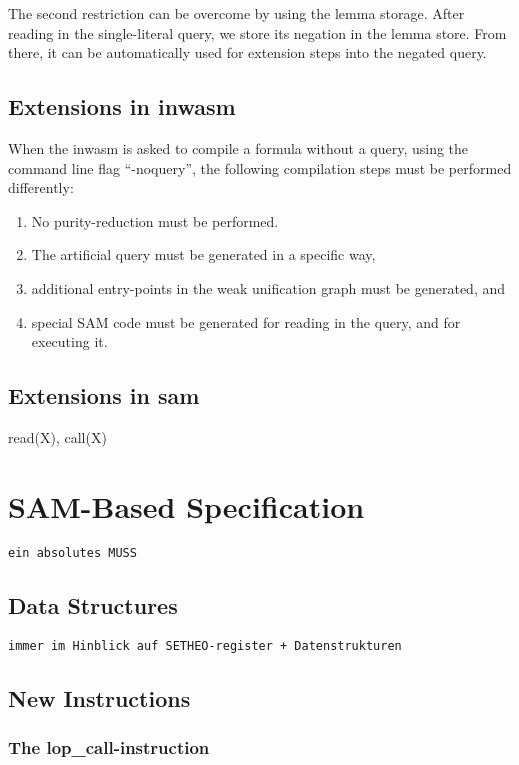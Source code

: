 The second restriction can be overcome by using the lemma storage.
After reading in the single-literal query, we store its negation
in the lemma store. From there, it can be automatically used for
extension steps into the negated query.
 
\subsection{Extensions in inwasm}

When the inwasm is asked to compile a formula without a query, using
the command line flag ``-noquery'', the following compilation steps
must be performed differently:

\begin{enumerate}
\item
No purity-reduction must be performed.
\item
The artificial query must be generated in a specific way,
\item
additional entry-points in the weak unification graph must be
generated, and
\item
special SAM code must be generated for reading in the query, and for
executing it.
\end{enumerate}

\subsection{Extensions in sam}

read(X), call(X)


\section{SAM-Based Specification}

{\tt ein absolutes MUSS}

\subsection{Data Structures}

{\tt immer im Hinblick auf SETHEO-register + Datenstrukturen}

\subsection{New Instructions}

\subsubsection{The lop\_call-instruction}


